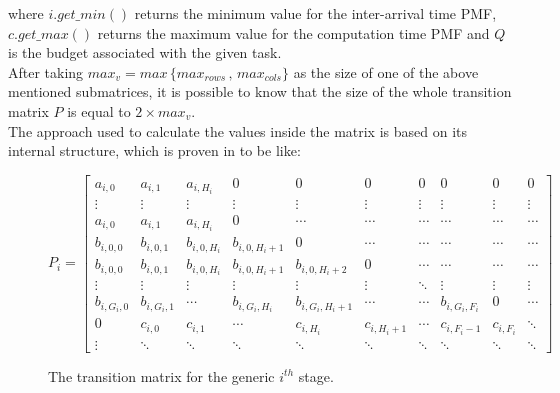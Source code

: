 where \( i.get\_min() \) returns the minimum value for the inter-arrival time PMF, \( c.get\_max() \) returns the maximum value for the computation time PMF and \( Q \) is the budget associated with the given task.\\
After taking \( max_{v} = max\,\{max_{rows}\,,\,max_{cols}\} \) as the size of one of the above mentioned submatrices, it is possible to know that the size of the whole transition matrix \( P \) is equal to \( 2 \times max_{v} \).\\
The approach used to calculate the values inside the matrix is based on its internal structure, which is proven in \cite{pipelines} to be like:
\begin{figure}[H] \label{matrixstructure}
\begin{equation*} 
  P_{i} = 
  \begin{bmatrix}
    a_{i,0} & a_{i,1} & a_{i,H_{i}} & 0 & 0 & 0 & 0 & 0 & 0 & 0 \\
    \vdots & \vdots & \vdots & \vdots & \vdots & \vdots & \vdots & \vdots & \vdots & \vdots\\
    a_{i,0} & a_{i,1} & a_{i,H_{i}} & 0 & \cdots & \cdots & \cdots & \cdots & \cdots & \cdots \\
    b_{i,0,0} & b_{i,0,1} & b_{i,0,H_{i}} & b_{i,0,H_{i}+1} & 0 & \cdots & \cdots & \cdots & \cdots & \cdots \\
    b_{i,0,0} & b_{i,0,1} & b_{i,0,H_{i}} & b_{i,0,H_{i}+1} & b_{i,0,H_{i}+2} & 0 & \cdots & \cdots & \cdots & \cdots \\
    \vdots & \vdots & \vdots & \vdots & \vdots & \vdots & \ddots & \vdots & \vdots & \vdots \\
    b_{i,G_{i},0} & b_{i,G_{i},1} & \cdots & b_{i,G_{i},H_{i}} & b_{i,G_{i},H_{i}+1} & \cdots & \cdots & b_{i,G_{i},F_{i}} & 0 & \cdots \\
    0 & c_{i,0} & c_{i,1} & \cdots & c_{i,H_{i}} & c_{i,H_{i}+1} & \cdots & c_{i,F_{i}-1} & c_{i,F_{i}} & \ddots \\
    \vdots & \ddots & \ddots & \ddots & \ddots & \ddots & \ddots & \ddots & \ddots & \ddots
  \end{bmatrix}
\end{equation*}
\caption{The transition matrix for the generic \( i^{th} \) stage.}
\end{figure}

